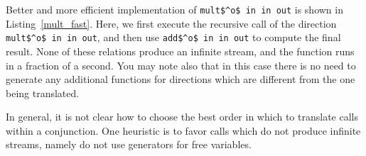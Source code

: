 Better and more efficient implementation of \lstinline{mult$^o$ in in out} is shown in Listing~\ref{mult_fast}.
Here, we first execute the recursive call of the direction \lstinline{mult$^o$ in in out}, and then use \lstinline{add$^o$ in in out} to compute the final result.
None of these relations produce an infinite stream, and the function runs in a fraction of a second.
You may note also that in this case there is no need to generate any additional functions for directions which are different from the one being translated.

In general, it is not clear how to choose the best order in which to translate calls within a conjunction.
One heuristic is to favor calls which do not produce infinite streams, namely do not use generators for free variables.

